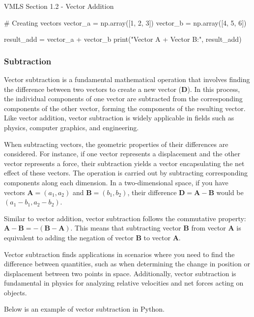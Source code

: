 \begin{notes}{VMLS Section 1.2 - Vector Addition}
\begin{highlight}
\begin{code}[Python]
    # Creating vectors
    vector_a = np.array([1, 2, 3])
    vector_b = np.array([4, 5, 6])
    
    result_add = vector_a + vector_b
    print("Vector A + Vector B:", result_add)
    \end{code}
    \end{highlight}

    \subsubsection*{Subtraction}

    Vector subtraction is a fundamental mathematical operation that involves finding the difference between two vectors to create a new vector ($\mathbf{D}$). In this process, the individual components of one vector 
    are subtracted from the corresponding components of the other vector, forming the components of the resulting vector. Like vector addition, vector subtraction is widely applicable in fields such as physics, 
    computer graphics, and engineering.

    When subtracting vectors, the geometric properties of their differences are considered. For instance, if one vector represents a displacement and the other vector represents a force, their subtraction yields a 
    vector encapsulating the net effect of these vectors. The operation is carried out by subtracting corresponding components along each dimension. In a two-dimensional space, if you have vectors $\mathbf{A} = (a_1, a_2)$ 
    and $\mathbf{B} = (b_1, b_2)$, their difference $\mathbf{D} = \mathbf{A} - \mathbf{B}$ would be $(a_1 - b_1, a_2 - b_2)$.
    
    Similar to vector addition, vector subtraction follows the commutative property: $\mathbf{A} - \mathbf{B} = -(\mathbf{B} - \mathbf{A})$. This means that subtracting vector $\mathbf{B}$ from vector $\mathbf{A}$ is 
    equivalent to adding the negation of vector $\mathbf{B}$ to vector $\mathbf{A}$.

    Vector subtraction finds applications in scenarios where you need to find the difference between quantities, such as when determining the change in position or displacement between two points in space. Additionally, 
    vector subtraction is fundamental in physics for analyzing relative velocities and net forces acting on objects.

    \begin{highlight}
        Below is an example of vector subtraction in Python.


\end{highlight}
\end{notes}

